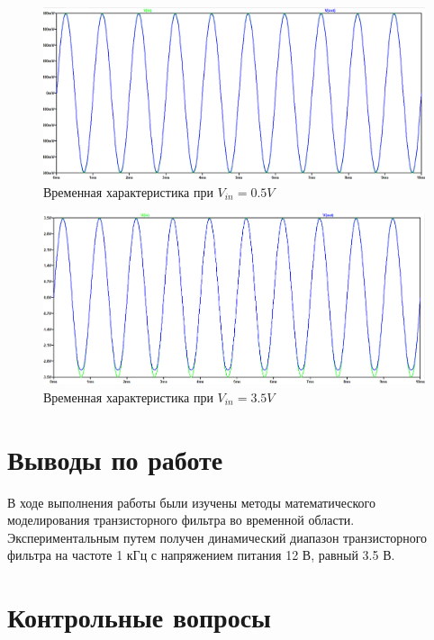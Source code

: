 \documentclass[a4paper,14pt]{article}
\begin{document}
\begin{figure}[H]
	\centering
	\includegraphics[width=\linewidth]{image/wave_1}
	\caption{Временная характеристика при $V_{in} = 0.5V$}
	\label{fig:wave_1}
\end{figure} 

\begin{figure}[H]
	\centering
	\includegraphics[width=\linewidth]{image/wave_2}
	\caption{Временная характеристика при $V_{in} = 3.5V$}
	\label{fig:wave_2}
\end{figure}
\section{Выводы по работе}

В	ходе  выполнения  работы  были  изучены  методы  математического моделирования транзисторного фильтра во временной области. Экспериментальным путем получен динамический диапазон транзисторного фильтра на частоте 1 кГц с напряжением питания 12 В, равный 3.5 В.


\section{Контрольные вопросы}
\end{document}
